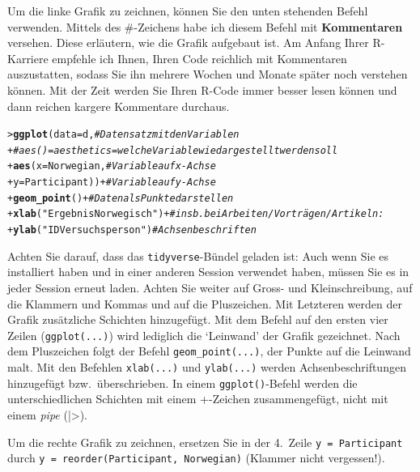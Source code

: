 \documentclass[oneside, 10pt]{book}\usepackage[]{graphicx}\usepackage[]{xcolor}
\makeatletter
\newcommand{\hlstr}[1]{\textcolor[rgb]{0.192,0.494,0.8}{#1}}%
\newcommand{\hlcom}[1]{\textcolor[rgb]{0.678,0.584,0.686}{\textit{#1}}}%
\newcommand{\hlopt}[1]{\textcolor[rgb]{0,0,0}{#1}}%
\newcommand{\hlstd}[1]{\textcolor[rgb]{0.345,0.345,0.345}{#1}}%
\newcommand{\hlkwc}[1]{\textcolor[rgb]{0.333,0.667,0.333}{#1}}%
\newcommand{\hlkwd}[1]{\textcolor[rgb]{0.737,0.353,0.396}{\textbf{#1}}}%
\newenvironment{kframe}{%
 \def\at@end@of@kframe{}%
 \ifinner\ifhmode%
  \def\at@end@of@kframe{\end{minipage}}%
  \begin{minipage}{\columnwidth}%
 \fi\fi%
 \def\FrameCommand##1{\hskip\@totalleftmargin \hskip-\fboxsep
 \colorbox{shadecolor}{##1}\hskip-\fboxsep
     \hskip-\linewidth \hskip-\@totalleftmargin \hskip\columnwidth}%
 \MakeFramed {\advance\hsize-\width
   \@totalleftmargin\z@ \linewidth\hsize
   \@setminipage}}%
 {\par\unskip\endMakeFramed%
 \at@end@of@kframe}
\newenvironment{knitrout}{}{} %
\makeatother
\begin{document}
Um die linke Grafik zu zeichnen, können Sie den unten stehenden Befehl
verwenden. Mittels des \#-Zeichens habe ich diesem Befehl mit \textbf{Kommentaren}
versehen. Diese erläutern, wie die Grafik aufgebaut ist.
Am Anfang Ihrer R-Karriere empfehle ich Ihnen, Ihren Code reichlich mit
Kommentaren auszustatten, sodass Sie ihn mehrere Wochen und Monate später
noch verstehen können. Mit der Zeit werden Sie Ihren R-Code immer besser
lesen können und dann reichen kargere Kommentare durchaus.
\begin{knitrout}
\color{fgcolor}\begin{kframe}
\begin{alltt}
\hlstd{> }\hlkwd{ggplot}\hlstd{(}\hlkwc{data} \hlstd{= d,}                \hlcom{# Datensatz mit den Variablen}
\hlstd{+ }       \hlcom{# aes() = aesthetics = welche Variable wie dargestellt werden soll}
\hlstd{+ }       \hlkwd{aes}\hlstd{(}\hlkwc{x} \hlstd{= Norwegian,}       \hlcom{# Variable auf x-Achse}
\hlstd{+ }           \hlkwc{y} \hlstd{= Participant))} \hlopt{+}  \hlcom{# Variable auf y-Achse}
\hlstd{+ }  \hlkwd{geom_point}\hlstd{()} \hlopt{+}                \hlcom{# Daten als Punkte darstellen}
\hlstd{+ }  \hlkwd{xlab}\hlstd{(}\hlstr{"Ergebnis Norwegisch"}\hlstd{)} \hlopt{+} \hlcom{# insb. bei Arbeiten/Vorträgen/Artikeln:}
\hlstd{+ }  \hlkwd{ylab}\hlstd{(}\hlstr{"ID Versuchsperson"}\hlstd{)}     \hlcom{#     Achsen beschriften}
\end{alltt}
\end{kframe}
\end{knitrout}

Achten Sie darauf, dass das \texttt{tidyverse}-Bündel
geladen ist: Auch wenn Sie es installiert haben und in einer anderen
Session verwendet haben, müssen Sie es in jeder Session erneut laden.
Achten Sie weiter auf Gross- und Kleinschreibung, auf die Klammern
und Kommas und auf die Pluszeichen. Mit Letzteren werden der Grafik
zusätzliche Schichten hinzugefügt. Mit dem
Befehl auf den ersten vier Zeilen (\texttt{ggplot(...)}) wird
lediglich die `Leinwand' der Grafik gezeichnet. Nach dem
Pluszeichen folgt der Befehl \texttt{geom\_point(...)},
der Punkte auf die Leinwand malt.
Mit den Befehlen \texttt{xlab(...)} und \texttt{ylab(...)} werden
Achsenbeschriftungen hinzugefügt bzw.\ überschrieben.
In einem \texttt{ggplot()}-Befehl werden die unterschiedlichen Schichten
mit einem +-Zeichen zusammengefügt, nicht mit einem \textit{pipe} (|>).

Um die rechte Grafik zu zeichnen, ersetzen Sie in der 4.\ Zeile
\texttt{y = Participant} durch \texttt{y = reorder(Participant, Norwegian)}
(Klammer nicht vergessen!).
\end{document}
